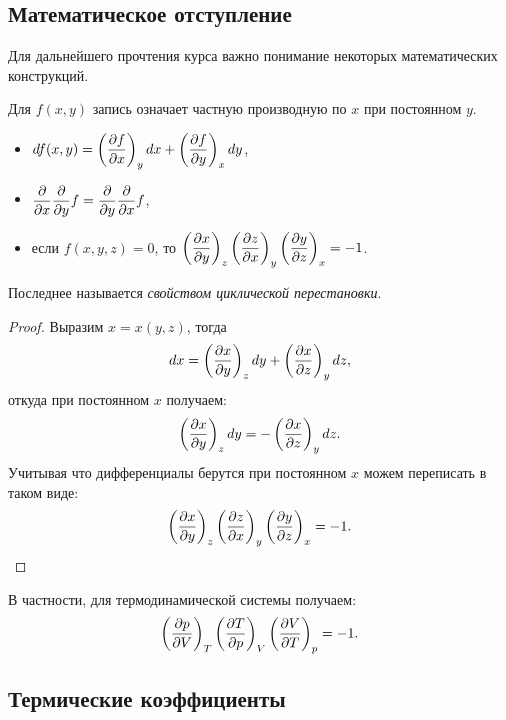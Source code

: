 \documentclass[../main.tex]{subfiles}
\begin{document}
    \subsection{Математическое отступление}
    Для дальнейшего прочтения курса важно понимание некоторых математических конструкций.
    \begin{note}
        Для $f(x, y)$ запись  означает частную производную по $x$ при постоянном $y$.
    \end{note}
    \begin{itemize}
        \item $df(x,y) = \left(\dfrac{\partial f}{\partial x}\right)_{y} dx + \left(\dfrac{\partial f}{\partial y}\right)_{x} dy$,
        \item $\dfrac{\partial }{\partial x} \dfrac{\partial }{\partial y} f= \dfrac{\partial }{\partial y} \dfrac{\partial }{\partial x} f$,
        \item если $f(x, y, z) = 0$, то $\left(\dfrac{\partial x}{\partial y}\right)_{z} \left(\dfrac{\partial z}{\partial x}\right)_{y} \left(\dfrac{\partial y}{\partial z}\right)_{x} = -1$.
    \end{itemize}
    Последнее называется \emph{свойством циклической перестановки}.
    \begin{proof}
        Выразим $x = x(y, z)$, тогда 
        \begin{equation}
            dx = \left(\dfrac{\partial x}{\partial y}\right)_{z} dy + \left(\dfrac{\partial x}{\partial z}\right)_{y} dz,
        \end{equation}
    откуда при постоянном $x$ получаем:
    \begin{equation}
        \left(\dfrac{\partial x}{\partial y}\right)_{z} dy = - \left(\dfrac{\partial x}{\partial z}\right)_{y} dz. 
    \end{equation}
    Учитывая что дифференциалы берутся при постоянном $x$ можем переписать в таком виде:
    \begin{equation}
        \left(\dfrac{\partial x}{\partial y}\right)_{z} \left(\dfrac{\partial z}{\partial x}\right)_{y} \left(\dfrac{\partial y}{\partial z}\right)_{x} = -1.
    \end{equation}
    \end{proof}
    
    \begin{note}
        В частности, для термодинамической системы получаем:
        \begin{equation}
            \label{eq:cyclic_permutation_pvt}
            \left(\dfrac{\partial p}{\partial V}\right)_{T} \left(\dfrac{\partial T}{\partial p}\right)_{V} \left(\dfrac{\partial V}{\partial T}\right)_{p} = -1.
        \end{equation}
    \end{note}

    \subsection{Термические коэффициенты}
\end{document}
